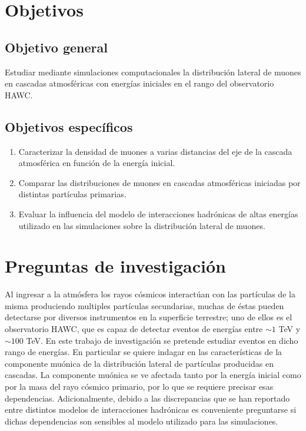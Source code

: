 \section{Objetivos}
	\subsection*{Objetivo general}
	Estudiar mediante simulaciones computacionales la distribución lateral de muones en cascadas atmosféricas con energías iniciales en el rango del observatorio HAWC.

	\subsection*{Objetivos específicos}	
	\begin{enumerate}
	\item Caracterizar la densidad de muones a varias distancias del eje de la cascada atmosf\'erica en funci\'on de la energ\'ia inicial.
	\item Comparar las distribuciones de muones en cascadas atmosf\'ericas iniciadas por distintas part\'iculas primarias.
	\item Evaluar la influencia del modelo de interacciones hadr\'onicas de altas energ\'ias utilizado en las simulaciones sobre la distribuci\'on lateral de muones.
	\end{enumerate}

\section{Preguntas de investigación}
Al ingresar a la atm\'osfera los rayos c\'osmicos interact\'uan con las part\'iculas de la misma produciendo multiples part\'iculas secundarias, muchas de \'estas pueden detectarse por diversos instrumentos en la superficie terrestre; uno de ellos es el observatorio HAWC, que es capaz de detectar eventos de energ\'ias entre $\sim 1$ TeV y $\sim 100$ TeV. En este trabajo de investigaci\'on se pretende estudiar eventos en dicho rango de energ\'ias. En particular se quiere indagar en las caracter\'isticas de la componente mu\'onica de la distribuci\'on lateral de part\'iculas producidas en cascadas. La componente mu\'onica se ve afectada tanto por la energ\'ia inicial como por la masa del rayo c\'osmico primario, por lo que se requiere precisar esas dependencias. Adicionalmente, debido a las discrepancias que se han reportado entre distintos modelos de interacciones hadr\'onicas es conveniente preguntarse si dichas dependencias son sensibles al modelo utilizado para las simulaciones.


